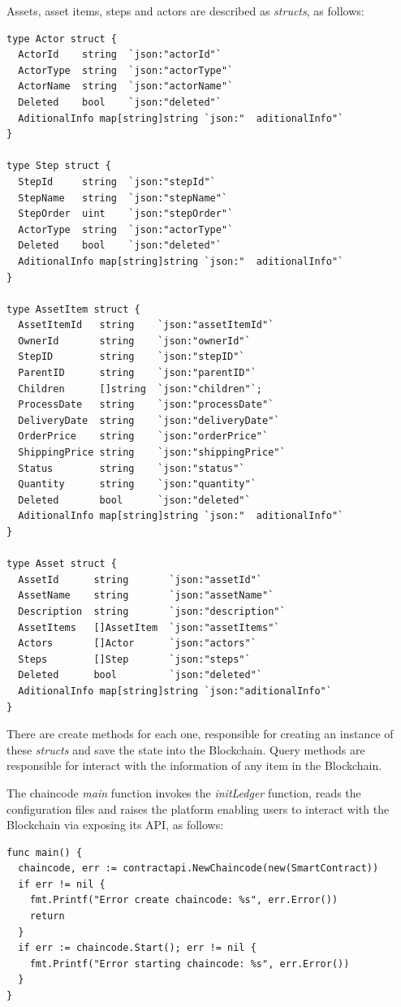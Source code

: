 Assets, asset items, steps and actors are described as \textit{structs}, as follows:

\begin{verbatim}
type Actor struct {
  ActorId    string  `json:"actorId"`
  ActorType  string  `json:"actorType"`
  ActorName  string  `json:"actorName"`
  Deleted    bool    `json:"deleted"`
  AditionalInfo map[string]string `json:"  aditionalInfo"`
}

type Step struct {
  StepId     string  `json:"stepId"`
  StepName   string  `json:"stepName"`
  StepOrder  uint    `json:"stepOrder"`
  ActorType  string  `json:"actorType"`
  Deleted    bool    `json:"deleted"`
  AditionalInfo map[string]string `json:"  aditionalInfo"`
}

type AssetItem struct {
  AssetItemId   string    `json:"assetItemId"`
  OwnerId       string    `json:"ownerId"`
  StepID        string    `json:"stepID"`
  ParentID      string    `json:"parentID"`
  Children      []string  `json:"children"`;
  ProcessDate   string    `json:"processDate"`
  DeliveryDate  string    `json:"deliveryDate"`
  OrderPrice    string    `json:"orderPrice"`
  ShippingPrice string    `json:"shippingPrice"`
  Status        string    `json:"status"`
  Quantity      string    `json:"quantity"`
  Deleted       bool      `json:"deleted"`
  AditionalInfo map[string]string `json:"  aditionalInfo"`
}

type Asset struct {
  AssetId      string       `json:"assetId"`
  AssetName    string       `json:"assetName"`
  Description  string       `json:"description"`
  AssetItems   []AssetItem  `json:"assetItems"`
  Actors       []Actor      `json:"actors"`
  Steps        []Step       `json:"steps"`
  Deleted      bool         `json:"deleted"`
  AditionalInfo map[string]string `json:"aditionalInfo"`
}
\end{verbatim}

There are create methods for each one,  responsible for creating an instance of these \textit{structs} and save the state into the Blockchain. Query methods are responsible for interact with the information of any item in the Blockchain.


The chaincode \textit{main} function invokes the \textit{initLedger} function, reads the configuration files and raises the platform enabling users to interact with the Blockchain via exposing its API, as follows: 

\begin{verbatim}
func main() {
  chaincode, err := contractapi.NewChaincode(new(SmartContract))
  if err != nil {
    fmt.Printf("Error create chaincode: %s", err.Error())
    return
  }
  if err := chaincode.Start(); err != nil {
    fmt.Printf("Error starting chaincode: %s", err.Error())
  }
}
\end{verbatim}

